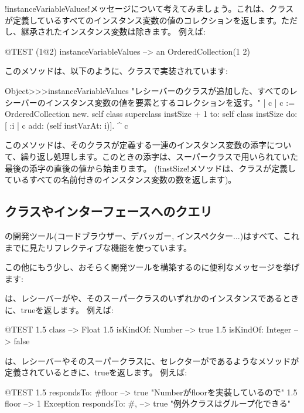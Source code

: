 \documentclass[a4paper,10pt,twoside]{book}
\begin{document}
\ct!instanceVariableValues!メッセージについて考えてみましょう。これは、クラスが定義しているすべてのインスタンス変数の値のコレクションを返します。ただし、継承されたインスタンス変数は除きます。
例えば:
\begin{code}{@TEST}
(1@2) instanceVariableValues --> an OrderedCollection(1 2)
\end{code}

このメソッドは、以下のように、クラスで実装されています:
\begin{code}{}
Object>>>instanceVariableValues
	"レシーバーのクラスが追加した、すべてのレシーバーのインスタンス変数の値を要素とするコレクションを返す。"	
	| c |
	c := OrderedCollection new.
	self class superclass instSize + 1
		to: self class instSize
		do: [ :i | c add: (self instVarAt: i)].
	^ c
\end{code}

このメソッドは、そのクラスが定義する一連のインスタンス変数の添字について、繰り返し処理します。このときの添字は、スーパークラスで用いられていた最後の添字の直後の値から始まります。
(\ct!instSize!メソッドは、クラスが定義しているすべての名前付きのインスタンス変数の数を返します)。

\subsection{クラスやインターフェースへのクエリ}

\pharo の開発ツール(コードブラウザー、デバッガー, インスペクター...)はすべて、これまでに見たリフレクティブな機能を使っています。

この他にもう少し、おそらく開発ツールを構築するのに便利なメッセージを挙げます:

は、レシーバーがや、そのスーパークラスのいずれかのインスタンスであるときに、trueを返します。
例えば:
\begin{code}{@TEST}
1.5 class                     --> Float
1.5 isKindOf: Number --> true
1.5 isKindOf: Integer   --> false
\end{code}

は、レシーバーやそのスーパークラスに、セレクターがであるようなメソッドが定義されているときに、trueを返します。
例えば:
\begin{code}{@TEST}
1.5 respondsTo: #floor      --> true    "Numberがfloorを実装しているので"
1.5 floor                            --> 1
Exception respondsTo: #, --> true    "例外クラスはグループ化できる"
\end{code}
\end{document}
